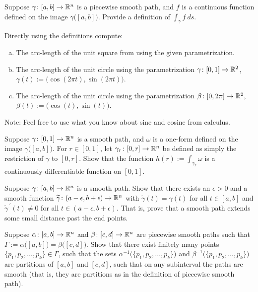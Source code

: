 \begin{exercise}
Suppose $\gamma \colon [a,b] \to {\mathbb{R}}^n$ is a piecewise smooth path, and $f$ is a
continuous function defined on the image $\gamma\bigl([a,b]\bigr)$.
Provide a definition of $\int_{\gamma} f ~ds$.
\end{exercise}

\begin{exercise}
Directly using the definitions compute:
\begin{enumerate}[a)]
\item
The arc-length of the unit square from
 using the given parametrization.
\item
The arc-length of the unit circle using the parametrization
$\gamma \colon [0,1] \to {\mathbb{R}}^2$, $\gamma(t) := \bigl(\cos(2\pi t),\sin(2\pi t)\bigr)$.
\item
The arc-length of the unit circle using the parametrization
$\beta \colon [0,2\pi] \to {\mathbb{R}}^2$, $\beta(t) := \bigl(\cos(t),\sin(t)\bigr)$.
\end{enumerate}
Note: Feel free to use what you know about sine and cosine from calculus.
\end{exercise}

\begin{exercise}
Suppose $\gamma \colon [0,1] \to {\mathbb{R}}^n$ is a smooth path, and
$\omega$ is a one-form defined on the image $\gamma\bigl([a,b]\bigr)$.
For $r \in [0,1]$, let $\gamma_r \colon [0,r] \to {\mathbb{R}}^n$ be defined
as simply the restriction of $\gamma$ to $[0,r]$.  Show that the
function $h(r) := \int_{\gamma_r} \omega$ is a continuously
differentiable function on $[0,1]$.
\end{exercise}

\begin{exercise}
Suppose $\gamma \colon [a,b] \to {\mathbb{R}}^n$ is a smooth path.
Show that there exists an $\epsilon > 0$ and a smooth function
$\widetilde{\gamma} \colon (a-\epsilon,b+\epsilon) \to {\mathbb{R}}^n$
with $\widetilde{\gamma}(t) = \gamma(t)$ for all $t \in [a,b]$
and $\widetilde{\gamma}^{\:\prime}(t) \not= 0$ for all $t \in 
(a-\epsilon,b+\epsilon)$.  That is, prove that a smooth path extends
some small distance past the end points.
\end{exercise}

\begin{exercise} 
Suppose $\alpha \colon [a,b] \to {\mathbb{R}}^n$ and
$\beta \colon [c,d] \to {\mathbb{R}}^n$ are piecewise smooth paths such that
$\Gamma := \alpha\bigl([a,b]\bigr) = \beta\bigl([c,d]\bigr)$.
Show that there exist finitely many points
$\{ p_1,p_2,\ldots,p_k\} \in \Gamma$, such that
the sets
$\alpha^{-1}\bigl( \{ p_1,p_2,\ldots,p_k\} \bigr)$
and
$\beta^{-1}\bigl( \{ p_1,p_2,\ldots,p_k\} \bigr)$
are partitions of $[a,b]$ and $[c,d]$, such that on any subinterval
the paths are smooth (that is, they are partitions as in the definition
of piecewise smooth path).
\end{exercise}

